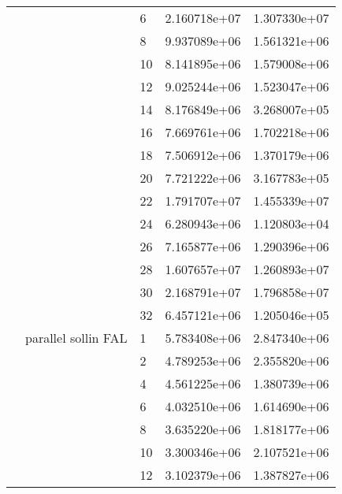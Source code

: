 \begin{tabular}{lllrr}
                      &                     & 6  &  2.160718e+07 &  1.307330e+07 \\
                      &                     & 8  &  9.937089e+06 &  1.561321e+06 \\
                      &                     & 10 &  8.141895e+06 &  1.579008e+06 \\
                      &                     & 12 &  9.025244e+06 &  1.523047e+06 \\
                      &                     & 14 &  8.176849e+06 &  3.268007e+05 \\
                      &                     & 16 &  7.669761e+06 &  1.702218e+06 \\
                      &                     & 18 &  7.506912e+06 &  1.370179e+06 \\
                      &                     & 20 &  7.721222e+06 &  3.167783e+05 \\
                      &                     & 22 &  1.791707e+07 &  1.455339e+07 \\
                      &                     & 24 &  6.280943e+06 &  1.120803e+04 \\
                      &                     & 26 &  7.165877e+06 &  1.290396e+06 \\
                      &                     & 28 &  1.607657e+07 &  1.260893e+07 \\
                      &                     & 30 &  2.168791e+07 &  1.796858e+07 \\
                      &                     & 32 &  6.457121e+06 &  1.205046e+05 \\
                      & parallel sollin FAL & 1  &  5.783408e+06 &  2.847340e+06 \\
                      &                     & 2  &  4.789253e+06 &  2.355820e+06 \\
                      &                     & 4  &  4.561225e+06 &  1.380739e+06 \\
                      &                     & 6  &  4.032510e+06 &  1.614690e+06 \\
                      &                     & 8  &  3.635220e+06 &  1.818177e+06 \\
                      &                     & 10 &  3.300346e+06 &  2.107521e+06 \\
                      &                     & 12 &  3.102379e+06 &  1.387827e+06 \\

\end{tabular}
